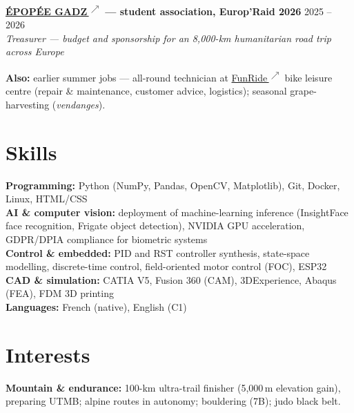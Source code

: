 \documentclass[10pt,a4paper]{article}
\newcommand{\lk}{\,\textsuperscript{$\nearrow$}}
\newcommand{\link}[2]{\href{#1}{#2\lk}}
\begin{document}
\vspace{0.35em}
\textbf{\link{https://europraid.fr/}{ÉPOPÉE GADZ} --- student association, Europ'Raid 2026} \hfill 2025 -- 2026\\
\textit{Treasurer --- budget and sponsorship for an 8,000-km humanitarian road trip across Europe}

\vspace{0.2em}
\textbf{Also:} earlier summer jobs --- all-round technician at \link{https://www.funride30.fr/}{FunRide} bike leisure centre (repair \& maintenance, customer advice, logistics); seasonal grape-harvesting (\textit{vendanges}).

\section{Skills}

\textbf{Programming:} Python (NumPy, Pandas, OpenCV, Matplotlib), Git, Docker, Linux, HTML/CSS\\
\textbf{AI \& computer vision:} deployment of machine-learning inference (InsightFace face recognition, Frigate object detection), NVIDIA GPU acceleration, GDPR/DPIA compliance for biometric systems\\
\textbf{Control \& embedded:} PID and RST controller synthesis, state-space modelling, discrete-time control, field-oriented motor control (FOC), ESP32\\
\textbf{CAD \& simulation:} CATIA V5, Fusion 360 (CAM), 3DExperience, Abaqus (FEA), FDM 3D printing\\
\textbf{Languages:} French (native), English (C1)

\section{Interests}

\textbf{Mountain \& endurance:} 100-km ultra-trail finisher (5,000\,m elevation gain), preparing UTMB; alpine routes in autonomy; bouldering (7B); judo black belt.
\end{document}
